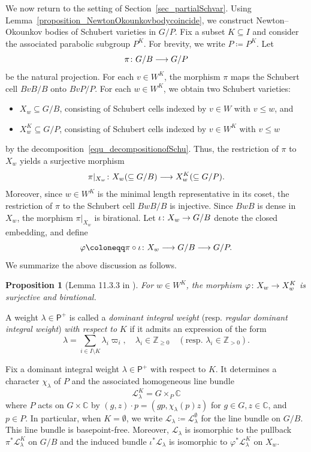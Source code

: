 \documentclass[11pt]{amsart}
\newcommand{\C}{\mathbb{C}}
\newcommand{\Z}{\mathbb{Z}}
\def\mcal{\mathcal}
\numberwithin{equation}{section}
\theoremstyle{plain}
\newtheorem{proposition}[theorem]{Proposition}
\theoremstyle{definition}
\def\to{\mathchoice{\longrightarrow}{\rightarrow}{\rightarrow}{\rightarrow}}
\numberwithin{equation}{section}
\begin{document}
We now return to the setting of Section~\ref{sec_partialSchvar}. Using Lemma~\ref{proposition_NewtonOkounkovbodycoincide}, we construct Newton--Okounkov bodies of Schubert varieties in $G/P$. Fix a subset $K \subseteq I$ and consider the associated parabolic subgroup $P^K$. For brevity, we write $P \coloneqq P^K$. Let 
$$
\pi \colon G/B \to G/P
$$ 
be the natural projection. For each $v \in W^K$, the morphism $\pi$ maps the Schubert cell $BvB/B$ onto $BvP/P$. For each $w \in W^K$, we obtain two Schubert varieties$\colon$ 
\begin{itemize}
\item $X_w \subseteq G/B$, consisting of Schubert cells indexed by $v \in W$ with $v \leq w$, and
\item $X_w^K \subseteq G/P$, consisting of Schubert cells indexed by $v \in W^K$ with $v \leq w$
\end{itemize}
by the decomposition~\eqref{equ_decompositionofSchu}. Thus, the restriction of $\pi$ to $X_w$ yields a surjective morphism 
$$
\pi |_{X_w} \colon X_w (\subseteq G/B) \to X_w^K (\subseteq G/P).
$$ 
Moreover, since $w \in W^K$ is the minimal length representative in its coset, the restriction of $\pi$ to the Schubert cell $BwB/B$ is injective. Since $BwB$ is dense in $X_w$, the morphism $\pi |_{X_w}$ is birational. Let $\iota \colon X_w \to G/B$ denote the closed embedding, and define
\begin{equation}\label{equ_varphidef}
\varphi \coloneqq \pi \circ \iota \colon X_w \to G/B \to G/P. 
\end{equation}
We summarize the above discussion as follows.

\begin{proposition}[Lemma 11.3.3 in \cite{Kum02}]\label{prop_morphismsujbiration}
For $w \in W^K$, the morphism $\varphi \colon X_w  \to X_w^K$ 
is surjective and birational.
\end{proposition}

A weight $\lambda \in \mathsf{P}^+$ is called a \emph{dominant integral weight} (resp. \emph{regular dominant integral weight}) \emph{with respect to} $K$ if it admits an expression of the form
$$
\lambda = \sum_{i \in I \setminus K} \lambda_i \varpi_i, \quad \lambda_i \in \Z_{\geq 0}  \quad (\mbox{resp. }  \lambda_i \in \Z_{> 0}). 
$$

Fix a dominant integral weight $\lambda \in \mathsf{P}^+$ with respect to $K$. It determines a character $\chi_\lambda$ of $P$ and the associated homogeneous line bundle
$$
\mcal{L}^K_\lambda = G \times_{P} \C
$$
where $P$ acts on $G \times \C$ by $(g,z) \cdot p = (gp, \chi_\lambda({p})z)$ for $g \in G, z \in \C$, and $p \in P$. In particular, when $K = \emptyset$, we write $\mcal{L}_\lambda \coloneqq \mcal{L}_\lambda^\emptyset$ for the line bundle on $G/B$. This line bundle is basepoint-free. Moreover, $\mcal{L}_\lambda$ is isomorphic to the pullback $\pi^* \mcal{L}_\lambda^K$ on $G/B$ and the induced bundle $\iota^* \mcal{L}_\lambda$ is isomorphic to $\varphi^* \mcal{L}_\lambda^K$ on $X_w$. 
\end{document}

